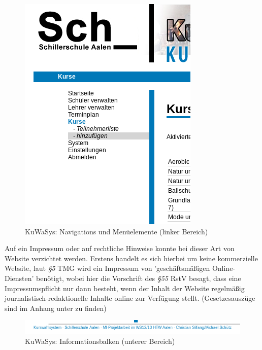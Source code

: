 \begin{figure}[H]
 \begin{center}
   \includegraphics[scale=0.65]{img/navigation_KuWaSys.png}
 \end{center}
 \caption[\textbf{KuWaSys: Navigations und Menüelemente (linker Bereich)}]{KuWaSys: Navigations und Menüelemente (linker Bereich)}
 \label{fig:navihervorhebung_KuWaSys}
\end{figure}

Auf ein Impressum oder auf rechtliche Hinweise konnte bei dieser Art von Website verzichtet werden. 
Erstens handelt es sich hierbei um keine kommerzielle Website, laut \textit{§5} \ac{TMG} wird ein Impressum von 'geschäftsmäßigen Online-Diensten' benötigt, wobei hier die Vorschrift des \textit{§55} \ac{RstV} besagt, dass eine Impressumspflicht nur dann besteht, wenn der Inhalt der Website regelmäßig journalistisch-redaktionelle Inhalte online zur Verfügung stellt.
(Gesetzesauszüge sind im Anhang unter  zu finden) 

\begin{figure}[h]
 \begin{center}
   \includegraphics[scale=0.7]{img/footer_KuWaSys.png}
 \end{center}
 \caption[\textbf{KuWaSys: Informationsbalken (unterer Bereich)}]{KuWaSys: Informationsbalken (unterer Bereich)}
 \label{fig:footer_KuWaSys}
\end{figure}


